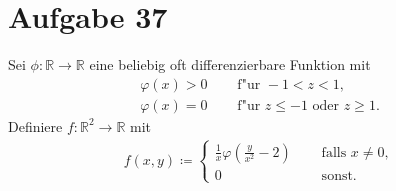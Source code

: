 \documentclass{article}
\newcommand{\R}{\mathbb{R}}
\begin{document}
\section*{Aufgabe 37}
Sei $\phi: \R \to \R$ eine beliebig oft differenzierbare Funktion mit
\begin{align*}
    \varphi(x) > 0 \quad &\text{ f"ur } -1 < z < 1,\\
    \varphi(x) = 0 \quad &\text{ f"ur } z \leq -1 \text{ oder } z \geq 1.
\end{align*}
Definiere $f: \R^2 \to \R$ mit 
\begin{align*}
    f(x,y) \coloneqq 
    \begin{cases}
        \frac{1}{x}\varphi(\frac{y}{x^2}-2) \quad & \text{ falls } x \neq 0, \\
        0                                   \quad & \text{ sonst.}
    \end{cases}
\end{align*}
\end{document}
